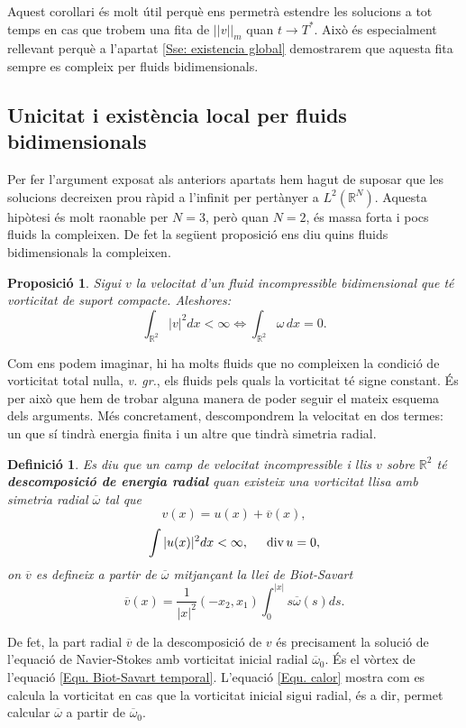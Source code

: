 \documentclass{article}
\numberwithin{equation}{section}
\DeclareMathOperator{\diver}{div}
\newtheorem{definicio}{Definici\'{o}}[section]
\newtheorem{proposicio}{Proposici\'{o}}[section]
\begin{document}
Aquest corol\textperiodcentered lari \'{e}s molt \'{u}til perqu\`{e} ens permetr\`{a} estendre les solucions a tot temps en cas que trobem una fita de $||v||_m$ quan $t\to T^*$. Aix\`{o} \'{e}s especialment rellevant perqu\`{e} a l'apartat \ref{Sse: existencia global} demostrarem que aquesta fita sempre es compleix per fluids bidimensionals.

\subsection{Unicitat i exist\`{e}ncia local per fluids bidimensionals}

Per fer l'argument exposat als anteriors apartats hem hagut de suposar que les solucions decreixen prou r\`{a}pid a l'infinit per pert\`{a}nyer a $L^2(\mathbb{R}^N)$. Aquesta hip\`{o}tesi \'{e}s molt raonable per $N=3$, per\`{o} quan $N=2$, \'{e}s massa forta i pocs fluids la compleixen. De fet la seg\"{u}ent proposici\'{o} ens diu quins fluids bidimensionals la compleixen.

\begin{proposicio}
Sigui $v$ la velocitat d'un fluid incompressible bidimensional que t\'{e} vorticitat de suport compacte. Aleshores:
\[\int_{\mathbb{R}^2}|v|^2dx<\infty\Longleftrightarrow\int_{\mathbb{R}^2}\omega\,dx=0.\]
\end{proposicio}

Com ens podem imaginar, hi ha molts fluids que no compleixen la condici\'{o} de vorticitat total nul\textperiodcentered la, \emph{v. gr.}, els fluids pels quals la vorticitat t\'{e} signe constant. \'{E}s per aix\`{o} que hem de trobar alguna manera de poder seguir el mateix esquema dels arguments. M\'{e}s concretament, descompondrem la velocitat en dos termes: un que s\'{i} tindr\`{a} energia finita i un altre que tindr\`{a} simetria radial.

\begin{definicio}
Es diu que un camp de velocitat incompressible i llis $v$ sobre $\mathbb{R}^2$ t\'{e} \textbf{descomposici\'{o} de energia radial} quan existeix una vorticitat llisa amb simetria radial $\overline\omega$ tal que
\[v(x)=u(x)+\overline v(x),\]
\[\int|u(x)|^2dx<\infty,\hspace{5mm}\diver u=0,\]
on $\overline v$ es defineix a partir de $\overline\omega$ mitjan\c{c}ant la llei de Biot-Savart
\[\overline v(x)=\frac{1}{|x|^2}(-x_2,x_1)\int_0^{|x|}s\overline\omega(s)ds.\]
\end{definicio}

De fet, la part radial $\overline v$ de la descomposici\'{o} de $v$ \'{e}s precisament la soluci\'{o} de l'equaci\'{o} de Navier-Stokes amb vorticitat inicial radial $\overline\omega_0$. \'{E}s el v\`{o}rtex de l'equaci\'{o} \eqref{Equ. Biot-Savart temporal}. L'equaci\'{o} \eqref{Equ. calor} mostra com es calcula la vorticitat en cas que la vorticitat inicial sigui radial, \'{e}s a dir, permet calcular $\overline\omega$ a partir de $\overline\omega_0$.
\end{document}

